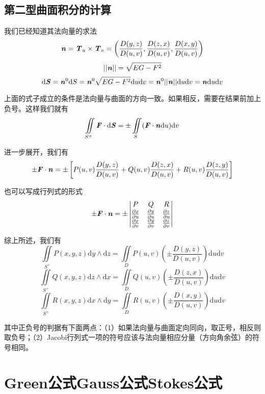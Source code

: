 \documentclass[UTF8,openany]{book}
\begin{document}
	\subsection{第二型曲面积分的计算}
	\par 我们已经知道其法向量的求法
	$$\textbf{\textit{n}}=\textbf{\textit{T}}_u\times\textbf{\textit{T}}_v=\left(\frac{D(y,z)}{D(u,v)},\frac{D(z,x)}{D(u,v)},\frac{D(x,y)}{D(u,v)}\right)$$
	$$||\textbf{\textit{n}}||=\sqrt{EG-F^2}$$
	$$\mathrm{d}\textbf{\textit{S}}=\textbf{\textit{n}}^0\mathrm{d}S=\textbf{\textit{n}}^0\sqrt{EG-F^2}\mathrm{d}u\mathrm{d}v=\textbf{\textit{n}}^0||\textbf{\textit{n}}||\mathrm{d}u\mathrm{d}v=\textbf{\textit{n}}\mathrm{d}u\mathrm{d}v$$
	\par 上面的式子成立的条件是法向量与曲面的方向一致。如果相反，需要在结果前加上负号。这样我们就有
	$$\iint\limits_{S^+}\textbf{\textit{F}}\cdot\mathrm{d}\textbf{\textit{S}}=\pm\iint\limits_{S}(\textbf{\textit{F}}\cdot\textbf{\textit{n}}\mathrm{d}u)\mathrm{d}v$$
	\par 进一步展开，我们有
	$$\pm\textbf{\textit{F}}\cdot\textbf{\textit{n}}=\pm\left[P(u,v)\frac{D(y,z)}{D(u,v)}+Q(u,v)\frac{D(z,x)}{D(u,v)}+R(u,v)\frac{D(z,y)}{D(u,v)}\right]$$
	\par 也可以写成行列式的形式
	$$\pm\textbf{\textit{F}}\cdot\textbf{\textit{n}}=\pm
	\begin{vmatrix}
	P & Q & R\\
	\frac{\partial x}{\partial u} & \frac{\partial y}{\partial u} & \frac{\partial z}{\partial u}\\
	\frac{\partial x}{\partial v} & \frac{\partial y}{\partial v} & \frac{\partial z}{\partial v}\\
	\end{vmatrix}$$
	\par 综上所述，我们有
	$$\iint\limits_{S^+}P(x,y,z)\mathrm{d}y\land\mathrm{d}z=
	\iint\limits_{D}P(u,v)\left(\pm\frac{D(y,z)}{D(u,v)}\right)\mathrm{d}u\mathrm{d}v$$
	$$\iint\limits_{S^+}Q(x,y,z)\mathrm{d}z\land\mathrm{d}x=
	\iint\limits_{D}Q(u,v)\left(\pm\frac{D(z,x)}{D(u,v)}\right)\mathrm{d}u\mathrm{d}v$$
	$$\iint\limits_{S^+}R(x,y,z)\mathrm{d}x\land\mathrm{d}y=
	\iint\limits_{D}R(u,v)\left(\pm\frac{D(x,y)}{D(u,v)}\right)\mathrm{d}u\mathrm{d}v$$
	\par 其中正负号的判据有下面两点：（1）如果法向量与曲面定向同向，取正号，相反则取负号；（2）Jacobi行列式一项的符号应该与法向量相应分量（方向角余弦）的符号相同。
	\section{Green公式\quad Gauss公式\quad Stokes公式}
\end{document}

